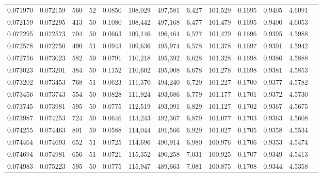 \begin{tabular}{rrrrrrrrrrrrr}
0.071970 & 0.072159 &   560 &  52 &                                     0.0850 & 108,029 & 497,581 &   6,427 & 101,529 & 0.1695 & 0.9405 & 4.6091 \\
0.072159 & 0.072295 &   413 &  50 &                                     0.1080 & 108,442 & 497,168 &   6,477 & 101,479 & 0.1695 & 0.9400 & 4.6053 \\
0.072295 & 0.072573 &   704 &  50 &                                     0.0663 & 109,146 & 496,464 &   6,527 & 101,429 & 0.1696 & 0.9395 & 4.5988 \\
0.072578 & 0.072750 &   490 &  51 &                                     0.0943 & 109,636 & 495,974 &   6,578 & 101,378 & 0.1697 & 0.9391 & 4.5942 \\
0.072756 & 0.073023 &   582 &  50 &                                     0.0791 & 110,218 & 495,392 &   6,628 & 101,328 & 0.1698 & 0.9386 & 4.5888 \\
0.073023 & 0.073201 &   384 &  50 &                                     0.1152 & 110,602 & 495,008 &   6,678 & 101,278 & 0.1698 & 0.9381 & 4.5853 \\
0.073202 & 0.073453 &   768 &  51 &                                     0.0623 & 111,370 & 494,240 &   6,729 & 101,227 & 0.1700 & 0.9377 & 4.5782 \\
0.073456 & 0.073743 &   554 &  50 &                                     0.0828 & 111,924 & 493,686 &   6,779 & 101,177 & 0.1701 & 0.9372 & 4.5730 \\
0.073745 & 0.073981 &   595 &  50 &                                     0.0775 & 112,519 & 493,091 &   6,829 & 101,127 & 0.1702 & 0.9367 & 4.5675 \\
0.073987 & 0.074253 &   724 &  50 &                                     0.0646 & 113,243 & 492,367 &   6,879 & 101,077 & 0.1703 & 0.9363 & 4.5608 \\
0.074255 & 0.074463 &   801 &  50 &                                     0.0588 & 114,044 & 491,566 &   6,929 & 101,027 & 0.1705 & 0.9358 & 4.5534 \\
0.074464 & 0.074693 &   652 &  51 &                                     0.0725 & 114,696 & 490,914 &   6,980 & 100,976 & 0.1706 & 0.9353 & 4.5474 \\
0.074694 & 0.074981 &   656 &  51 &                                     0.0721 & 115,352 & 490,258 &   7,031 & 100,925 & 0.1707 & 0.9349 & 4.5413 \\
0.074983 & 0.075223 &   595 &  50 &                                     0.0775 & 115,947 & 489,663 &   7,081 & 100,875 & 0.1708 & 0.9344 & 4.5358 \\

\end{tabular}
